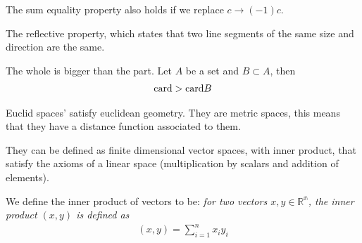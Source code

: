 \documentclass{book}
\begin{document}
The sum equality property also holds if we replace $c\to (-1)c$.

The reflective property, which states that two line segments of the same size
and direction are the same.

The whole is bigger than the part. Let $A$ be a set and $B\subset A$, then
\begin{equation*}
    \begin{split}
        \textnormal{card} > \textnormal{card} B
    \end{split}
\end{equation*}

Euclid spaces' satisfy euclidean geometry. They are metric spaces, this means
that they have a distance function associated to them.

They can be defined as finite dimensional vector spaces, with inner product,
that satisfy the axioms of a linear space (multiplication by scalars and
addition of elements).

We define the inner product of vectors to be: \textit{for two vectors
    $x,y\in\mathbb{R^{n}}$, the inner product $\left(x,y\right)$ is defined as}
    \begin{equation}
        \begin{split}
            \left(x,y\right) = \sum_{i=1}^{n}{x_i y_i}
        \end{split}
    \end{equation}
\end{document}
